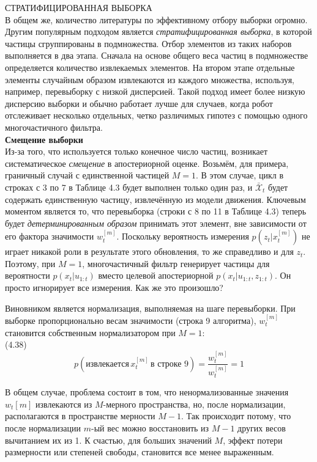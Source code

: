 \documentclass[10pt,a4paper]{article}
\begin{document}
СТРАТИФИЦИРОВАННАЯ ВЫБОРКА\\
В общем же, количество литературы по эффективному отбору выборки огромно. Другим популярным подходом является \textit{стратифицированная выборка}, в которой частицы сгруппированы в подмножества. Отбор элементов из таких наборов выполняется в два этапа. Сначала на основе общего веса частиц в подмножестве определяется количество извлекаемых элементов. На втором этапе отдельные элементы случайным образом извлекаются из каждого множества, используя, например, перевыборку с низкой дисперсией. Такой подход имеет более низкую дисперсию выборки и обычно работает лучше для случаев, когда робот отслеживает несколько отдельных, четко различимых гипотез с помощью одного многочастичного фильтра.\\
 
\textbf{Смещение выборки}\\

Из-за того, что используется только конечное число частиц, возникает систематическое \textit{смещение} в апостериорной оценке. Возьмём, для примера, граничный случай с единственной частицей $M = 1$. В этом случае, цикл в строках с 3 по 7 в Таблице 4.3 будет выполнен только один раз, и $\bar{\mathcal X}_t$ будет содержать единственную частицу, извлечённую из модели движения. Ключевым моментом является то, что перевыборка (строки с 8 по 11 в Таблице 4.3) теперь будет \textit{детерминированным образом} принимать этот элемент, вне зависимости от его фактора значимости $w_t^{[m]}$. Поскольку вероятность измерения $p(z_t | x_t^{[m]})$ не играет никакой роли в результате этого обновления, то же справедливо и для $z_t$. Поэтому, при $M = 1$, многочастичный фильтр генерирует частицы для вероятности $p(x_t | u_{1:t})$ вместо целевой апостериорной $p(x_t | u_{1:t}, z_{1:t})$. Он просто игнорирует все измерения.
Как же это произошло?

Виновником является нормализация, выполняемая на шаге перевыборки. При выборке пропорционально весам значимости (строка 9 алгоритма),
$w_t^{[m]}$ становится собственным нормализатором при $M = 1$:\\

(4.38)
$$p(\text{извлекается}\,x_t^{[m]}\,\text{в строке 9})=\frac{w_t^{[m]}}{w_t^{[m]}}=1$$

В общем случае, проблема состоит в том, что ненормализованные значения $w_t[m]$ извлекаются из $M$-мерного пространства, но, после нормализации, располагаются в пространстве мерности $M - 1$. Так происходит потому, что после нормализации $m$-ый вес можно восстановить из $M - 1$ других весов вычитанием их из
1. К счастью, для больших значений $M$, эффект потери размерности или степеней свободы, становится все менее выраженным.\\
\end{document}
